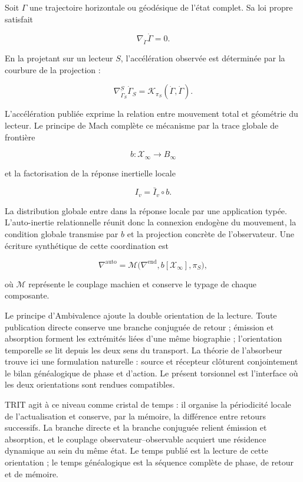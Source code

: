 Soit \(\Gamma\) une trajectoire horizontale ou géodésique de l'état complet. Sa loi propre satisfait

\[
\nabla_{\dot\Gamma}\dot\Gamma=0.
\]

En la projetant sur un lecteur \(S\), l'accélération observée est déterminée par la courbure de la projection :

\[
\nabla^S_{\dot\Gamma_S}\dot\Gamma_S
=
\mathcal K_{\pi_S}(\dot\Gamma,\dot\Gamma).
\]

L'accélération publiée exprime la relation entre mouvement total et géométrie du lecteur. Le principe de Mach complète ce mécanisme par la trace globale de frontière

\[
b:\mathcal X_\infty\longrightarrow B_\infty
\]

et la factorisation de la réponse inertielle locale

\[
I_v=\bar I_v\circ b.
\]

La distribution globale entre dans la réponse locale par une application typée. L'auto-inertie relationnelle réunit donc la connexion endogène du mouvement, la condition globale transmise par \(b\) et la projection concrète de l'observateur. Une écriture synthétique de cette coordination est

\[
\nabla^{\mathrm{auto}}
=
\mathcal M\bigl(
\nabla^{\mathrm{end}},
b[\mathcal X_\infty],
\pi_S
\bigr),
\]

où \(\mathcal M\) représente le couplage machien et conserve le typage de chaque composante.

Le principe d'Ambivalence ajoute la double orientation de la lecture. Toute publication directe conserve une branche conjuguée de retour ; émission et absorption forment les extrémités liées d'une même biographie ; l'orientation temporelle se lit depuis les deux sens du transport. La théorie de l'absorbeur trouve ici une formulation naturelle : source et récepteur clôturent conjointement le bilan généalogique de phase et d'action. Le présent torsionnel est l'interface où les deux orientations sont rendues compatibles.

TRIT agit à ce niveau comme cristal de temps : il organise la périodicité locale de l'actualisation et conserve, par la mémoire, la différence entre retours successifs. La branche directe et la branche conjuguée relient émission et absorption, et le couplage observateur–observable acquiert une résidence dynamique au sein du même état. Le temps publié est la lecture de cette orientation ; le temps généalogique est la séquence complète de phase, de retour et de mémoire.

